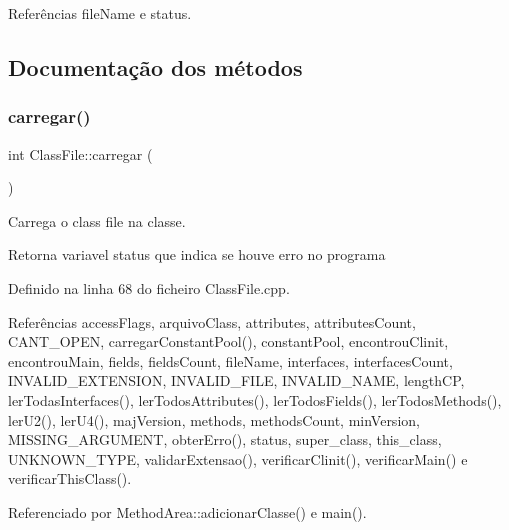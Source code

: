 Referências file\+Name e status.



\subsection{Documentação dos métodos}
\mbox{\label{classClassFile_a619e102ada15202ab84981d43362a3e9}} 
\subsubsection{\texorpdfstring{carregar()}{carregar()}}
{\footnotesize\ttfamily int Class\+File\+::carregar (\begin{DoxyParamCaption}{ }\end{DoxyParamCaption})}



Carrega o class file na classe. 

\begin{DoxyReturn}{Retorna}
variavel status que indica se houve erro no programa 
\end{DoxyReturn}


Definido na linha 68 do ficheiro Class\+File.\+cpp.



Referências access\+Flags, arquivo\+Class, attributes, attributes\+Count, C\+A\+N\+T\+\_\+\+O\+P\+EN, carregar\+Constant\+Pool(), constant\+Pool, encontrou\+Clinit, encontrou\+Main, fields, fields\+Count, file\+Name, interfaces, interfaces\+Count, I\+N\+V\+A\+L\+I\+D\+\_\+\+E\+X\+T\+E\+N\+S\+I\+ON, I\+N\+V\+A\+L\+I\+D\+\_\+\+F\+I\+LE, I\+N\+V\+A\+L\+I\+D\+\_\+\+N\+A\+ME, length\+CP, ler\+Todas\+Interfaces(), ler\+Todos\+Attributes(), ler\+Todos\+Fields(), ler\+Todos\+Methods(), ler\+U2(), ler\+U4(), maj\+Version, methods, methods\+Count, min\+Version, M\+I\+S\+S\+I\+N\+G\+\_\+\+A\+R\+G\+U\+M\+E\+NT, obter\+Erro(), status, super\+\_\+class, this\+\_\+class, U\+N\+K\+N\+O\+W\+N\+\_\+\+T\+Y\+PE, validar\+Extensao(), verificar\+Clinit(), verificar\+Main() e verificar\+This\+Class().



Referenciado por Method\+Area\+::adicionar\+Classe() e main().

